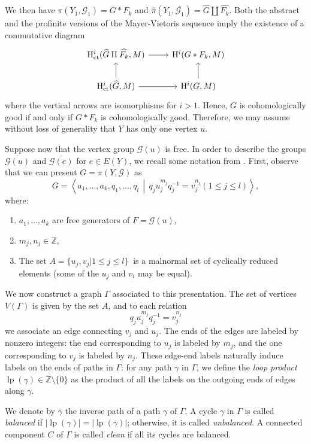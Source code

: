 \documentclass[a4paper]{amsart}
\theoremstyle{definition}
\theoremstyle{remark}
\newcommand{\G}{\mathcal G}
\newcommand{\HH}{\mathrm{H}}
\newcommand{\hpi}{\widehat{\pi}}
\begin{document}
We then have \(\pi(Y_1,\G_1) = G * F_k\) and \(\hpi(Y_1,\overline{\G_1}) = \widehat{G} \amalg \widehat{F_k}\). Both the abstract and the profinite versions of the Mayer-Vietoris sequence imply the existence of a commutative diagram
\[\begin{tikzcd}
{\HH^i_{\mathrm{ct}}(\widehat{G}\amalg \widehat{F_k}, M)} \arrow[r] & {\HH^i(G*F_k,M)}       \\
{\HH^i_{\mathrm{ct}}(\widehat{G},M)} \arrow[u] \arrow[r]            & {\HH^i(G,M)} \arrow[u]
\end{tikzcd}\]
where the vertical arrows are isomorphisms for \(i > 1\). Hence, \(G\) is cohomologically good if and only if \(G * F_k\) is cohomologically good. Therefore, we may assume without loss of generality that \(Y\) has only one vertex \(u\).

Suppose now that the vertex group \(\G(u)\) is free. In order to describe the groups \( \overline{\G(u)} \) and \( \overline{\G(e)} \) for \(e \in E(Y)\), we recall some notation from \cite{AM24}. First, observe that we can present \(G = \pi(Y, \G) \) as
\[G = \left\langle a_1, \ldots, a_k, q_1, \ldots, q_l \,\middle|\, q_j u_j^{m_j} q_j^{-1} = v_j^{n_j} (1\le j\le l)\right\rangle,\]
where:
\begin{enumerate}
    \item \(a_1, \ldots, a_k \) are free generators of \( F = \mathcal{G}(u) \),
    \item  \( m_j, n_j \in \mathbb{Z} \),
    \item  The set \(A= \{ u_j, v_j |1\le j\le l\}\ \)  is a malnormal set of cyclically reduced elements (some of the $u_j$ and $v_i$ may be equal).
\end{enumerate}

We now construct a graph \(\Gamma\) associated to this presentation. The set of vertices \(V(\Gamma)\) is given by the set \( A \), and to each relation \[q_j u_j^{m_j} q_j^{-1} = v_j^{n_j}\] we associate an edge connecting  \(v_j\) and  \(u_j\). The ends of the edges are labeled by nonzero integers: the end corresponding to \(u_j\) is labeled by \(m_j\), and the one corresponding to \(v_j\) is labeled by \(n_j\). These edge-end labels naturally induce labels on the ends of paths in \(\Gamma\): for any path \(\gamma\) in \(\Gamma\), we define the \emph{loop product} \(\operatorname{lp}(\gamma) \in \mathbb{Z} \setminus \{0\}\) as the product of all the labels on the outgoing ends of edges along \(\gamma\).

We denote by \(\overline{\gamma}\) the inverse path of a path \(\gamma\) of \(\Gamma\). A cycle \(\gamma\) in \(\Gamma\) is called \emph{balanced} if \(|\operatorname{lp}(\gamma)| = |\operatorname{lp}(\overline{\gamma})|\); otherwise, it is called \emph{unbalanced}. A connected component \(C\) of \(\Gamma\) is called \emph{clean} if all its cycles are balanced.
\end{document}
